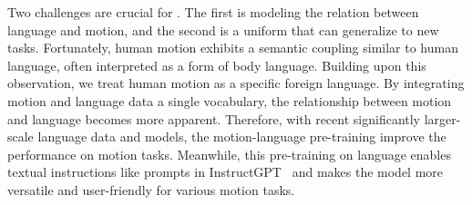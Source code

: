Two challenges are crucial  for . The first is modeling the relation between language and motion, and the second is  a uniform  that can generalize to new tasks.
%
Fortunately, human motion exhibits a semantic coupling similar to human language, often interpreted as a form of body language.
% 
Building upon this observation,%
we  treat human motion as a specific foreign language. 
% 
By integrating motion and language data  a single vocabulary, the relationship between motion and language 
becomes more apparent.
%
Therefore, with recent significantly larger-scale language data and models, the motion-language pre-training  improve the performance on motion tasks.
%
Meanwhile, this pre-training on language enables textual instructions like prompts in InstructGPT~\cite{ouyang2022instructgpt} and makes the model more versatile and user-friendly for various motion tasks.

